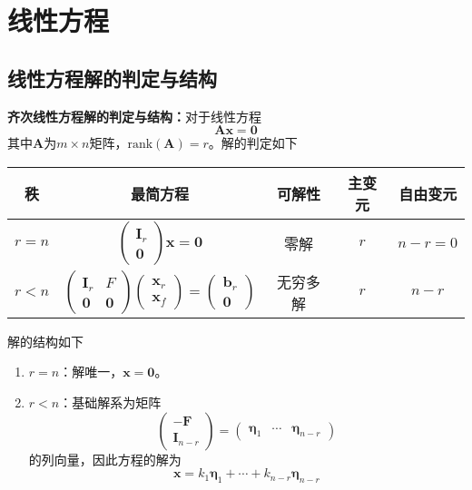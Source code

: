 \documentclass[lang = cn, scheme = chinese, thmcnt = section]{elegantbook}
\newcommand{\bs}{\boldsymbol}          %
\newcommand{\rank}{\text{rank}}        %
\begin{document}
\chapter{线性方程}

\section{线性方程解的判定与结构}

\textbf{齐次线性方程解的判定与结构：}对于线性方程
$$
\bs{Ax}=\bs{0}
$$
其中$\bs{A}$为$m\times n$矩阵，$\rank(\bs{A})=r$。解的判定如下
\begin{table}[H]
	\centering
	\begin{tabular}{ccccc}
		\toprule
		秩 & 最简方程 & 可解性 & 主变元 & 自由变元 \\
		\midrule
		$r=n$ & $\begin{pmatrix}\bs{I}_r\\\bs{0}\end{pmatrix}\bs{x}=\bs{0}$ & 零解 & $r$ & $n-r=0$ \\
		$r<n$ & $\begin{pmatrix}\bs{I}_r&F\\\bs{0}&\bs{0}\end{pmatrix}\begin{pmatrix}\bs{x}_r\\\bs{x}_f\end{pmatrix}=\begin{pmatrix}\bs{b}_r\\\bs{0}\end{pmatrix}$ & 无穷多解 & $r$ & $n-r$ \\
		\bottomrule
	\end{tabular}
\end{table}
解的结构如下
\begin{enumerate}
	\item $r=n$：解唯一，$\bs{x}=\bs{0}$。
	\item $r<n$：基础解系为矩阵
	$$
	\begin{pmatrix}
		-\bs{F}\\
		\bs{I}_{n-r}
	\end{pmatrix}
	=\begin{pmatrix}
		\bs{\eta}_1&\cdots&\bs{\eta}_{n-r}
	\end{pmatrix}
	$$
	的列向量，因此方程的解为
	$$
	\bs{x}=k_1\bs{\eta}_1+\cdots+k_{n-r}\bs{\eta}_{n-r}
	$$
\end{enumerate}
\end{document}
